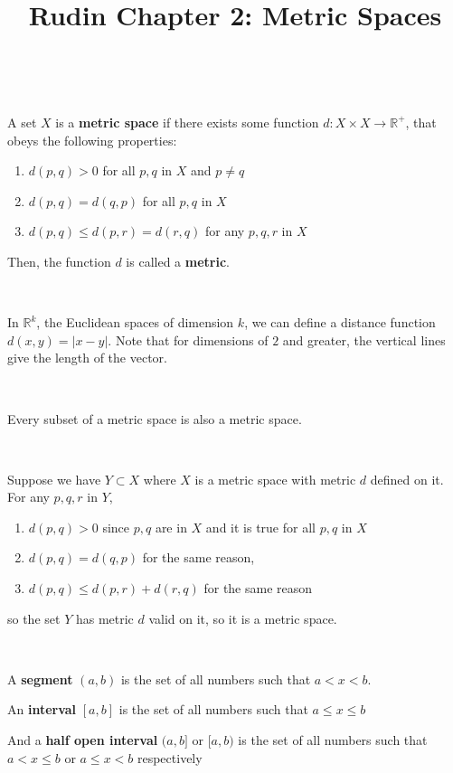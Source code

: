 \documentclass{article}
\title{Rudin Chapter 2: Metric Spaces}
\begin{document}
\maketitle

\begin{definition}[Metric]
\

A set $X$ is a \textbf{metric space} if there exists some function $d: X \times X \to \mathbb{R}^+$, that obeys the following properties:

\begin{enumerate}
    \item $d(p,q) > 0$ for all $p,q$ in $X$ and $p \neq q$
    \item $d(p,q) = d(q,p)$ for all $p,q$ in $X$
    \item $d(p,q) \leq d(p,r) = d(r,q)$ for any $p,q,r$ in $X$
\end{enumerate}

Then, the function $d$ is called a \textbf{metric}. 
\end{definition}


\begin{example}
\

In $\mathbb{R}^k$, the Euclidean spaces of dimension $k$, we can define a distance function $d(x,y) = \vert x - y \vert$. Note that for dimensions of $2$ and greater, the vertical lines give the length of the vector.
\end{example}

\begin{proposition}
\

Every subset of a metric space is also a metric space.
\end{proposition}

\begin{customproof}
\

Suppose we have $Y \subset X$ where $X$ is a metric space with metric $d$ defined on it. For any $p,q,r$ in $Y$, \begin{enumerate}
    \item $d(p,q) > 0$ since $p,q$ are in $X$ and it is true for all $p,q$ in $X$
    \item $d(p,q) = d(q,p)$ for the same reason,
    \item $d(p,q) \leq d(p,r) + d(r,q)$ for the same reason
\end{enumerate}
so the set $Y$ has metric $d$ valid on it, so it is a metric space.
\end{customproof}

\begin{definition}
\

A \textbf{segment} $(a,b)$ is the set of all numbers such that $a < x < b$.

An \textbf{interval} $[a,b]$ is the set of all numbers such that $a \leq x \leq b$ 

And a \textbf{half open interval} $(a,b]$ or $[a,b)$ is the set of all numbers such that $a < x \leq b$ or $a \leq x < b$ respectively 
\end{definition}
\end{document}
